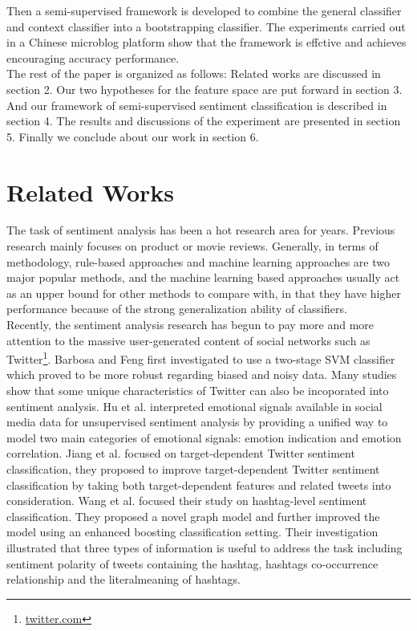 \documentclass{llncs}
\begin{document}
Then a semi-supervised framework is developed to combine the general classifier and context classifier into a bootstrapping classifier.  The experiments carried out in a Chinese microblog platform show that the framework is  effctive and achieves encouraging accuracy performance.\\
The rest of the paper is organized as follows: Related works are discussed in
section 2. Our two hypotheses for the feature space are put forward in
section 3. And our framework of semi-supervised sentiment classification is described in section 4. The results and discussions of the experiment are presented in section
5. Finally we conclude about our work in section 6.
\section{Related Works}
The task of sentiment analysis has been a hot research area for years. 
Previous research mainly focuses on product or movie reviews. 
Generally, in terms of methodology, rule-based approaches and machine learning approaches are two major popular methods, 
and the machine learning based approaches usually act as an upper bound for other methods to compare with, in that they have higher performance because of the strong generalization ability of classifiers\cite{xsongx:b4,xsongx:b1}.\\
Recently, the sentiment analysis research has begun to pay more and more attention to the massive user-generated content of social networks such as Twitter\footnote{\url{twitter.com}}. 
Barbosa and Feng\cite{Barbosa:2010RSD} first investigated to use a two-stage SVM classifier which proved to be more robust regarding biased and noisy data. 
Many studies show that some unique characteristics of Twitter can also be incoporated into sentiment analysis.
Hu et al.\cite{Hu:2013www} interpreted emotional signals available in social media data for unsupervised sentiment analysis by providing a unified way to model two main categories of emotional signals: emotion indication and emotion correlation. 
Jiang et al.\cite{xsongx:b6} focused on target-dependent Twitter sentiment classification, they proposed to improve target-dependent Twitter sentiment classification by taking both target-dependent features and related tweets into consideration. 
Wang et al.\cite{Wang:2011TSA} focused their study on hashtag-level sentiment classification. 
They proposed a novel graph model and further improved the model using an enhanced boosting classification setting. 
Their investigation illustrated that three types of information is useful to address the task including sentiment polarity of tweets containing the hashtag, hashtags co-occurrence relationship and the literalmeaning of hashtags.
\end{document}
